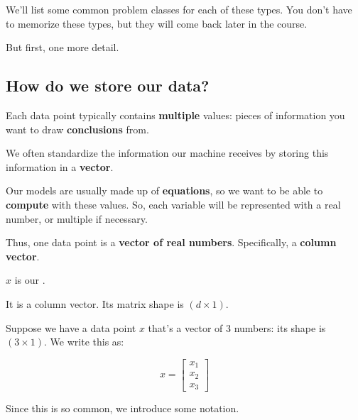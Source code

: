        We'll list some common problem classes for each of these types. You don't have to memorize these types, but they will come back later in the course.
        
        But first, one more detail.
        
        \subsection{How do we store our data?}
        
            Each data point typically contains \textbf{multiple} values: pieces of information you want to draw \textbf{conclusions} from.
            
            We often standardize the information our machine receives by storing this information in a \textbf{vector}.
            
            Our models are usually made up of \textbf{equations}, so we want to be able to \textbf{compute} with these values. So, each variable will be represented with a real number, or multiple if necessary.
            
            Thus, one data point is a \textbf{vector of real numbers}. Specifically, a \textbf{column vector}.\\
            
            \begin{notation}
                $x$ is our .
                
                It is a column vector. Its matrix shape is $(d \times 1)$.
            \end{notation}
            
            \miniex Suppose we have a data point $x$ that's a vector of 3 numbers: its shape is $(3 \times 1)$. We write this as:
            
            \begin{equation}
                x = 
                \begin{bmatrix}
                    x_1 \\ x_2 \\ x_3
                \end{bmatrix}
            \end{equation}
            
            
            
            Since this is so common, we introduce some notation.
            
